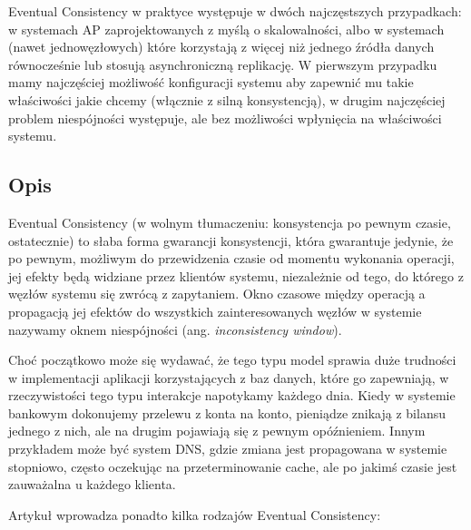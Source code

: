 Eventual Consistency w praktyce występuje w dwóch najczęstszych przypadkach: w systemach AP zaprojektowanych z myślą o skalowalności, albo w systemach (nawet jednowęzłowych) które korzystają z więcej niż jednego źródła danych równocześnie lub stosują asynchroniczną replikację.
W pierwszym przypadku mamy najczęściej możliwość konfiguracji systemu aby zapewnić mu takie właściwości jakie chcemy (włącznie z silną konsystencją), w drugim najczęściej problem niespójności występuje, ale bez możliwości wpłynięcia na właściwości systemu.

\subsection*{Opis}

Eventual Consistency (w wolnym tłumaczeniu: konsystencja po pewnym czasie, ostatecznie) to słaba forma gwarancji konsystencji, która gwarantuje jedynie, że po pewnym, możliwym do przewidzenia czasie od momentu wykonania operacji, jej efekty będą widziane przez klientów systemu, niezależnie od tego, do którego z węzłów systemu się zwrócą z zapytaniem.
Okno czasowe między operacją a propagacją jej efektów do wszystkich zainteresowanych węzłów w systemie nazywamy oknem niespójności (ang. \emph{inconsistency window}).

Choć początkowo może się wydawać, że tego typu model sprawia duże trudności w implementacji aplikacji korzystających z baz danych, które go zapewniają, w rzeczywistości tego typu interakcje napotykamy każdego dnia.
Kiedy w systemie bankowym dokonujemy przelewu z konta na konto, pieniądze znikają z bilansu jednego z nich, ale na drugim pojawiają się z pewnym opóźnieniem.
Innym przykładem może być system DNS, gdzie zmiana jest propagowana w systemie stopniowo, często oczekując na przeterminowanie cache, ale po jakimś czasie jest zauważalna u każdego klienta.

Artykuł \cite{vogels-eventually-consistent} wprowadza ponadto kilka rodzajów Eventual Consistency:

